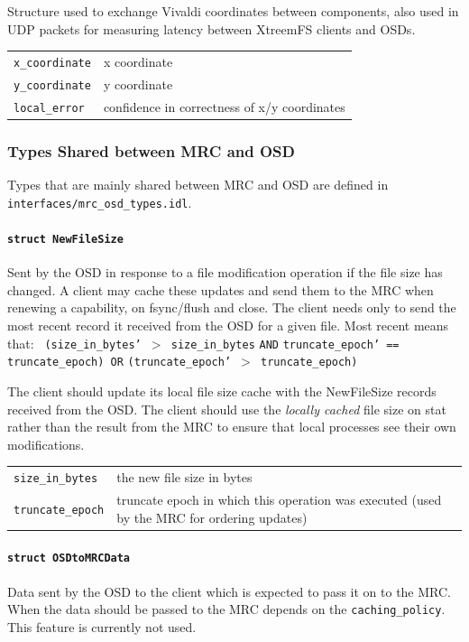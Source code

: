 Structure used to exchange Vivaldi coordinates between components, also used in UDP packets for measuring latency between XtreemFS clients and OSDs.

\begin{tabularx}{\textwidth}{lX}
 \texttt{x\_coordinate} & x coordinate\\
 \texttt{y\_coordinate} & y coordinate\\
 \texttt{local\_error} & confidence in correctness of x/y coordinates
\end{tabularx}


\subsubsection{Types Shared between MRC and OSD}

Types that are mainly shared between MRC and OSD are defined in \texttt{inter\-faces/mrc\_osd\_\-types.idl}.

\paragraph{\texttt{struct NewFileSize}}
Sent by the OSD in response to a file modification operation if the file size has changed. A client may cache these updates and send them to the MRC when renewing a capability, on fsync/flush and close. The client needs only to send the most recent record it received from the OSD for a given file. Most recent means that: \texttt{
(size\_in\_bytes' $>$ size\_in\_bytes} \texttt{AND} \texttt{truncate\_epoch' == truncate\_epoch) 
OR} \texttt{(truncate\_epoch' $>$ truncate\_epoch)}

The client should update its local file size cache with the NewFileSize records received from the OSD. The client should use the \textit{locally cached} file size on stat rather than the result from the MRC to ensure that local processes see their own modifications.

\begin{tabularx}{\textwidth}{lX}
 \texttt{size\_in\_bytes} & the new file size in bytes\\
 \texttt{truncate\_epoch} & truncate epoch in which this operation was executed (used by the MRC\index{MRC} for ordering updates)
\end{tabularx}


\paragraph{\texttt{struct OSDtoMRCData}}
Data sent by the OSD to the client which is expected to pass it on to the MRC. When the data should be passed to the MRC depends on the \texttt{caching\_policy}. This feature is currently not used.

